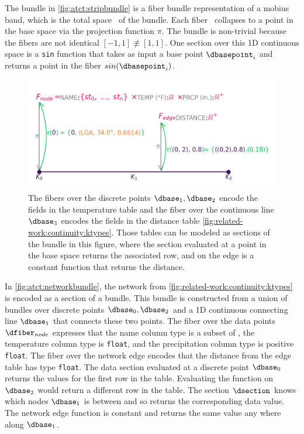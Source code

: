 \documentclass[10pt,journal,compsoc]{IEEEtran}
\theoremstyle{definition}
\theoremstyle{remark}
\begin{document}
The bundle in \autoref{fig:atct:stripbundle} is a fiber bundle representation of a mobius band, which is the total space \dtotal\ of the bundle. Each fiber \dfiber\ collapses to a point in the base space via the projection function $\pi$. The bundle is non-trivial because the fibers are not identical $[-1, 1] \not \equiv [1, 1]$. One section over this 1D continuous space is a \texttt{sin} function that takes as input a base point $\dbasepoint_{i}$ and returns a point in the fiber $sin(\dbasepoint_{i})$. 

\begin{figure}[h!]
  \includegraphics[width=\columnwidth]{fbnet.png}
  \caption{The fibers over the discrete points $\dbase_{1}, \dbase_{2}$  encode the fields in the temperature table and the fiber over the continuous line $\dbase_{3}$ encodes the fields in the distance table \autoref{fig:related-work:continuity:ktypes}. Those tables can be modeled as sections of the bundle in this figure, where the section evaluated at a point in the base space returns the associated row, and on the edge is a constant function that returns the distance.
  \label{fig:atct:networkbundle}}
\end{figure}

In \autoref{fig:atct:networkbundle}, the network from \autoref{fig:related-work:continuity:ktypes} is encoded as a section of a bundle. This bundle is constructed from a union of bundles over discrete points $\dbase_{0}, \dbase_{2}$ and a 1D continuous connecting line $\dbase_{1}$ that connects these two points. The fiber over the data points $\dfiber_{node}$ expresses that the name column type is a subset of , the temperature column type is \texttt{float}, and the precipitation column type is positive \texttt{float}. The fiber over the network edge encodes that the distance from the edge table has type \texttt{float}. The data section evaluated at a discrete point $\dbase_{0}$ returns the values for the first row in the table. Evaluating the function on $\dbase_{2}$ would return a different row in the table. The section $\dsection$ knows which nodes $\dbase_{1}$ is between and so returns the corresponding data value.  The network edge function is constant and returns the same value any where along $\dbase_{1}$. 
\end{document}
